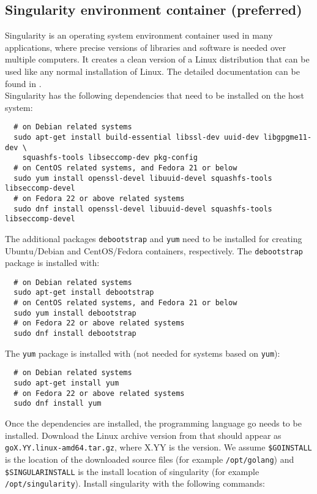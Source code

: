 \documentclass[12pt,a4paper]{report}
\begin{document}
\subsection{Singularity environment container (preferred)}
Singularity \cite{singularity} is an operating system environment container used in many applications, where precise versions of libraries and software is needed over multiple computers. It creates a clean version of a Linux distribution that can be used like any normal installation of Linux. The detailed documentation can be found in \cite{singularitydoc}.\\
Singularity has the following dependencies that need to be installed on the host system:
\footnotesize
\begin{verbatim}
  # on Debian related systems
  sudo apt-get install build-essential libssl-dev uuid-dev libgpgme11-dev \
    squashfs-tools libseccomp-dev pkg-config
  # on CentOS related systems, and Fedora 21 or below
  sudo yum install openssl-devel libuuid-devel squashfs-tools libseccomp-devel
  # on Fedora 22 or above related systems
  sudo dnf install openssl-devel libuuid-devel squashfs-tools libseccomp-devel
\end{verbatim}
\normalsize
The additional packages \texttt{debootstrap} and \texttt{yum} need to be installed for creating Ubuntu/Debian and CentOS/Fedora containers, respectively. The \texttt{debootstrap} package is installed with:
\footnotesize
\begin{verbatim}
  # on Debian related systems
  sudo apt-get install debootstrap
  # on CentOS related systems, and Fedora 21 or below
  sudo yum install debootstrap
  # on Fedora 22 or above related systems
  sudo dnf install debootstrap
\end{verbatim}
\normalsize
The \texttt{yum} package is installed with (not needed for systems based on \texttt{yum}):
\footnotesize
\begin{verbatim}
  # on Debian related systems
  sudo apt-get install yum
  # on Fedora 22 or above related systems
  sudo dnf install yum
\end{verbatim}
\normalsize
Once the dependencies are installed, the programming language go needs to be installed. Download the Linux archive version from \cite{godown} that should appear as \texttt{goX.YY.linux-amd64.tar.gz}, where X.YY is the version. We assume \texttt{\$GOINSTALL} is the location of the downloaded source files (for example \linebreak\texttt{/opt/golang}) and \texttt{\$SINGULARINSTALL} is the install location of singularity (for example \texttt{/opt/singularity}). Install singularity with the following commands:
\end{document}
